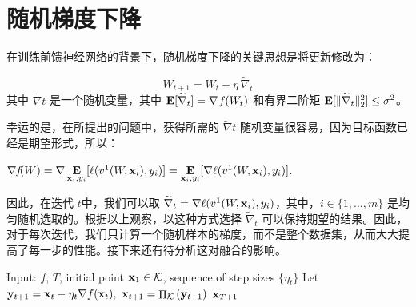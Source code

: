 \section{
    随机梯度下降
    }

在训练前馈神经网络的背景下，随机梯度下降的关键思想是将更新修改为：

\begin{equation}
W_{t+1} = W_t - \eta \, \widetilde{\nabla}_t
\end{equation}
其中 $\widetilde{\nabla}t$ 是一个随机变量，其中  $\mathop{\mbox{\bf E}}[\widetilde{\nabla}_t] = \nabla \, \textit{f} \, (W_t)$ 和有界二阶矩 $\mathop{\mbox{\bf E}}[\|\widetilde{\nabla}_t\|_2^2] \leq \sigma^2$。

幸运的是，在所提出的问题中，获得所需的 $\widetilde{\nabla}t$ 随机变量很容易，因为目标函数已经是期望形式，所以：
\begin{center}
$\nabla \textit{f}(W) = \nabla \mathop{\mbox{\bf E}}\limits_{\mathbf x_i, y_i} [\ell(v^1(W, \mathbf x_i), y_i)] = \mathop{\mbox{\bf E}}\limits_{\mathbf x_i, y_i} [\nabla \ell(v^1(W, \mathbf x_i), y_i)]$.
\end{center}

因此，在迭代 $t$中，我们可以取 $\widetilde{\nabla}_t = \nabla \ell(v^1(W, \mathbf x_i), y_i)$，其中，$i \in \{1,..., m\}$ 是均匀随机选取的。根据以上观察，以这种方式选择 $\widetilde{\nabla}_t $ 可以保持期望的结果。因此，对于每次迭代，我们只计算一个随机样本的梯度，而不是整个数据集，从而大大提高了每一步的性能。接下来还有待分析这对融合的影响。
\begin{algorithm}[h!]
\caption{
    随机梯度下降
    }
\label{alg:BasicSGD}
\begin{algorithmic}[1]
\STATE Input: $f$, $T$, initial point $\mathbf x_1 \in \mathcal K$, sequence of step sizes $\{\eta_t\}$
\STATE Let $ \mathbf y_{t+1} = \mathbf x_{t}-\eta_t {\nabla f}(\mathbf x_t) , \  \mathbf x_{t+1}= \mathop{\Pi}_{\mathcal K} \left( \mathbf y_{t+1}  \right) $
\ENDFOR
\RETURN ${\mathbf x}_{T+1} $ 
\end{algorithmic}
\end{algorithm}



